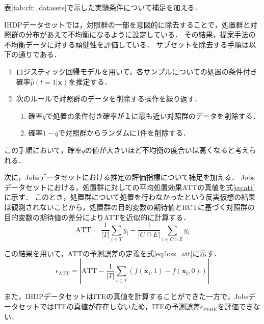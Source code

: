 \documentclass[dvipdfmx]{jreport}
\begin{document}
表\ref{tab:cfr_datasets}で示した実験条件について補足を加える．

IHDPデータセットでは，対照群の一部を意図的に除去することで，処置群と対照群の分布があえて不均衡になるように設定している．
その結果，提案手法の不均衡データに対する頑健性を評価している．
サブセットを除去する手順は以下の通りである．
\begin{tcolorbox}[title=\textbf{IHDPデータセットにおけるサブセット除去の手順}]
    \begin{enumerate}
        \item ロジスティック回帰モデルを用いて，各サンプルについての処置の条件付き確率$\hat{p}(t=1|\boldsymbol{x})$を推定する．
        \item 次のルールで対照群のデータを削除する操作を繰り返す．
        \begin{enumerate}
            \item 確率$q$で処置の条件付き確率が１に最も近い対照群のデータを削除する．
            \item 確率$1-q$で対照群からランダムに1件を削除する．
        \end{enumerate}
    \end{enumerate}
\end{tcolorbox}
この手順において，確率$q$の値が大きいほど不均衡の度合いは高くなると考えられる．

次に，Jobsデータセットにおける推定の評価指標について補足を加える．
Jobsデータセットにおける，処置群に対しての平均処置効果ATTの真値を式\eqref{eq:att}に示す．
このとき，処置群について処置を行わなかったという反実仮想の結果は観測されないことから，処置群の目的変数の期待値とRCTに基づく対照群の目的変数の期待値の差分によりATTを近似的に計算する．
\begin{equation}
    \mathrm{ATT} = \frac{1}{|T|} \sum_{i \in T} y_i - \frac{1}{|C \cap E|} \sum_{i \in C \cap E} y_i \label{eq:att}
\end{equation}

この結果を用いて，ATTの予測誤差の定義を式\eqref{eq:loss_att}に示す．
\begin{equation}
    \epsilon_{\text{ATT}} = \left| \mathrm{ATT} - \frac{1}{|T|} \sum_{i \in T} \left( f(\boldsymbol{x_i}, 1) - f(\boldsymbol{x_i}, 0) \right) \right| \label{eq:loss_att}
\end{equation}

また，IHDPデータセットはITEの真値を計算することができた一方で，JobsデータセットではITEの真値が存在しないため，ITEの予測誤差$\epsilon_{\mathrm{PEHE}}$を評価できない．
\end{document}
